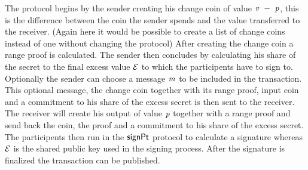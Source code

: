 The protocol begins by the sender creating his change coin of value $\mathit{v} ~-~ \mathit{p}$, this is the difference between the coin the sender spends and the value transferred to the receiver.
(Again here it would be possible to create a list of change coins instead of one without changing the protocol) After creating the change coin a range proof is calculated.
The sender then concludes by calculating his share of the secret to the final excess value $\mathcal{E}$ to which the participents have to sign to. Optionally the sender can choose a message $\mathit{m}$
to be included in the transaction. This optional message, the change coin together with its range proof, input coin and a commitment to his share of the excess secret is then sent to the receiver.
The receiver will create his output of value $\mathit{p}$ together with a range proof and send back the coin, the proof and a commitment to his share of the excess secret.
The participents then run in the $\mathsf{signPt}$ protocol to calculate a signature whereas $\mathcal{E}$ is the shared public key used in the signing process. After the signature is finalized
the transaction can be published.

\begin{figure}
    \begin{center}
        \fbox{
        \begin{varwidth}{\textwidth}
            \procedure[linenumbering]{$\procCreateCoin{\varValue}{\varBlindingFactor}$} {
            \varCoin \opFunResult \procCommit{\varValue}{\varBlindingFactor} \\
            \varProof \opFunResult \procProof{\varCoin}{\varValue}{\varBlindingFactor} \\
            \pcreturn (\varCoin, \varProof)
            }
            \procedure[linenumbering]{$\procCreatePreTx{\varMsg}{\funArray{\varCoinInp}}{\funArray{\varCoinOut}}{\funArray{\varProof}}{\varSigContext}{\funArray{\varCommitment}}{\varSignature}$}{
            \pcreturn ( \\
            \varMsg \opAssign \varMsg, \\
            \varInputs \opAssign \funArray{\varCoinInp}, \\
            \varOutputs \opAssign \funArray{\varCoinOut}, \\
            \varProofs \opAssign \funArray{\varProof}, \\
            \varSigContext \opAssign \varSigContext, \\
            \varCommits \opAssign \funArray{\varCommitment}, \\
            \varSignature \opAssign \varSignature \\
            )
            }
        \end{varwidth}
        }
    \end{center}
\end{figure}

